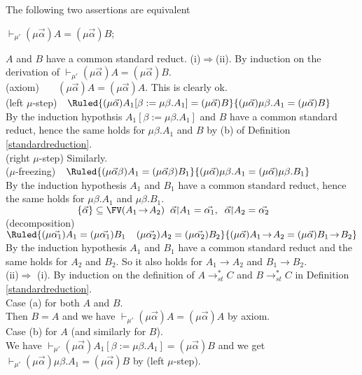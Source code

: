 \documentclass[11pt,aslarticle,xperspectives,bibay3]{asl}
\newcommand\prmua{\vdash_{\mu'}}
\newcommand\redst{\mathrel{\rightarrow^{\ast}_{st}}}
\newcommand\alphaarrow{\vec{\alpha}}
\newcommand\alphaeenarrow{\vec{\alpha_1}}
\newcommand\alphatweearrow{\vec{\alpha_2}}
\newcommand\restricted{\!\!\upharpoonright\!\!}
\begin{document}
{\bprop\label{prmuaiscommstred}
The following two assertions are equivalent
\bsub\item $\prmua(\mu\alphaarrow)A=(\mu\alphaarrow)B$;
\item $A$ and $B$ have a common standard reduct.
\esub
\eprop
\bpf (i)$\Rightarrow$(ii). By induction on the derivation of $\prmua(\mu\alphaarrow)A=(\mu\alphaarrow)B.$\\[1em]
(axiom)     $~~~~~~~(\mu\alphaarrow)A=(\mu\alphaarrow)A.$   This is clearly ok.\\[1em]
(left $\mu$-step)    $~~\Ruled {(\mu\alphaarrow)A_1[\beta :=\mu\beta.A_1] = (\mu\alphaarrow)B}{(\mu\alphaarrow)\mu\beta.A_1 = (\mu\alphaarrow)B} $\\[1em]
By the induction hypothsis $A_1[\beta :=\mu\beta.A_1]$ and $B$ have a common standard reduct, hence the same holds for $\mu\beta.A_1$ and $B$ by (b) of Definition \ref{standardreduction}.\\[1em]
(right $\mu$-step)      Similarly. \\[1em]
($\mu$-freezing)  $~~ \Ruled{(\mu\alphaarrow\beta)A_1=(\mu\alphaarrow\beta)B_1}{(\mu\alphaarrow)\mu\beta.A_1=(\mu\alphaarrow)\mu\beta.B_1}$ \\[1em]
By the induction hypothesis $A_1$ and $B_1$ have a common standard reduct, hence the same holds for $\mu\beta.A_1$ and $\mu\beta.B_1.$\\[1em]
$\;\;\;\;\;\;\;\;\;\;\;\;\;\;\;\;\;\;\;\;\;\;\;\;\;\;\{\alphaarrow\}\subseteq\FV(A_1\to A_2)\;\; \alphaarrow\restricted A_1=\alphaeenarrow, \;\; \alphaarrow\restricted A_2=\alphatweearrow$ \\
(decomposition)  $\Ruled{(\mu\alphaeenarrow)A_1=(\mu\alphaeenarrow)B_1\;\;\;\;(\mu\alphatweearrow)A_2=(\mu\alphatweearrow)B_2}
{(\mu\alphaarrow)A_1\to A_2=(\mu\alphaarrow)B_1\to B_2}$\\[1em]
By the induction hypothesis $A_1$ and $B_1$ have a common standard reduct and the same holds for $A_2$ and $B_2$. So it also holds for $A_1\to A_2$ and $B_1\to B_2.$\\[1em]
(ii)$\Rightarrow$ (i). By induction on the definition of $A\redst C$ and $B\redst C$ in Definition \ref{standardreduction}.\\[1em]
Case (a) for both $A$ and $B.$\\
 Then $B=A$ and we have $\prmua(\mu\alphaarrow)A=(\mu\alphaarrow)A$ by axiom.\\[1em]
Case (b) for $A$    (and similarly for $B$).\\
We have $\prmua(\mu\alphaarrow)A_1[\beta :=\mu\beta.A_1] = (\mu\alphaarrow)B$ and we get  $\prmua(\mu\alphaarrow)\mu\beta.A_1 = (\mu\alphaarrow)B$ by (left $\mu$-step).\\[1em]
}
\end{document}
